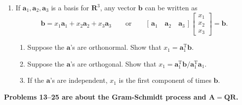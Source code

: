 \documentclass[14pt, a4paper]{article}
\begin{document}
\begin{enumerate}
    \item If $\boldsymbol{a}_1, \boldsymbol{a}_2, \boldsymbol{a}_3$ is a basis for $\mathbf{R}^3$, any vector $\boldsymbol{b}$ can be written as
          \[
              \boldsymbol{b} = x_1\boldsymbol{a}_1 + x_2\boldsymbol{a}_2 + x_3\boldsymbol{a}_3 \qquad \text{or} \qquad
              [\, \boldsymbol{a}_1 \quad \boldsymbol{a}_2 \quad \boldsymbol{a}_3 \,]
              \begin{bmatrix} x_1 \\ x_2 \\ x_3 \end{bmatrix} = \boldsymbol{b}.
          \]
          \begin{enumerate}
              \item Suppose the $\boldsymbol{a}$'s are orthonormal. Show that $x_1 = \boldsymbol{a}_1^{\mathrm{T}}\boldsymbol{b}$.
              \item Suppose the $\boldsymbol{a}$'s are orthogonal. Show that $x_1 = \boldsymbol{a}_1^{\mathrm{T}}\boldsymbol{b} / \boldsymbol{a}_1^{\mathrm{T}}\boldsymbol{a}_1$.
              \item If the $\boldsymbol{a}$'s are independent, $x_1$ is the first component of \underline{\hspace{1.5cm}} times $\boldsymbol{b}$.
          \end{enumerate}
\end{enumerate}

\noindent \textbf{Problems 13--25 are about the Gram-Schmidt process and $\boldsymbol{A = QR}$.}
\end{document}
